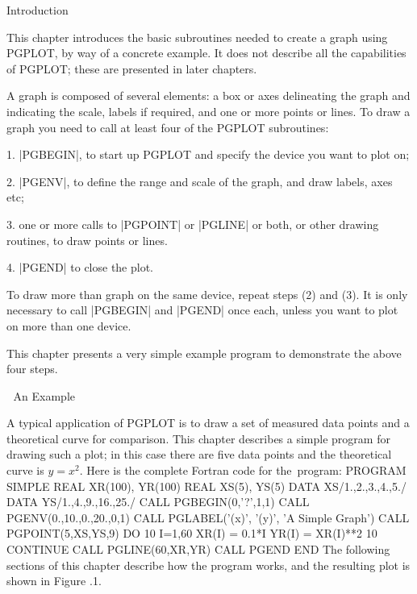 

\beginsection Introduction

This chapter introduces the basic subroutines needed to create a graph
using PGPLOT, by way of a concrete example.  It does not describe all 
the capabilities of PGPLOT; these are presented in later chapters. 

A graph is composed of several elements: a box or axes delineating the
graph and indicating the scale, labels if required, and one or more
points or lines.  To draw a graph you need to call at least four of the
PGPLOT subroutines: 

\item{1.} |PGBEGIN|, to start up PGPLOT and specify the device you want
to plot on; 

\item{2.} |PGENV|, to define the range and scale of the graph, and draw
labels, axes etc; 

\item{3.} one or more calls to |PGPOINT| or |PGLINE| or both, or other
drawing routines, to draw points or lines. 

\item{4.} |PGEND| to close the plot.

\noindent
To draw more than graph on the same device, repeat steps (2) and (3). It
is only necessary to call |PGBEGIN| and |PGEND| once each, unless you want
to plot on more than one device.

This chapter presents a very simple example program to demonstrate the
above four steps.


\beginsection An Example

A typical application of PGPLOT is to draw a set of measured data points
and a theoretical curve for comparison.  This chapter describes a
simple program for drawing such a plot; in this case
there are five data points and the theoretical curve is $y=x^2$.  Here 
is the complete Fortran code for the~program:
\begintt
      PROGRAM SIMPLE
      REAL XR(100), YR(100)
      REAL XS(5), YS(5)
      DATA XS/1.,2.,3.,4.,5./
      DATA YS/1.,4.,9.,16.,25./
      CALL PGBEGIN(0,'?',1,1)
      CALL PGENV(0.,10.,0.,20.,0,1)
      CALL PGLABEL('(x)', '(y)', 'A Simple Graph')
      CALL PGPOINT(5,XS,YS,9)
      DO 10 I=1,60
          XR(I) = 0.1*I
          YR(I) = XR(I)**2
   10 CONTINUE
      CALL PGLINE(60,XR,YR)
      CALL PGEND
      END
\endtt
The following sections of this chapter describe how the program works, 
and the resulting plot is shown in Figure \the\chapnum.1.


